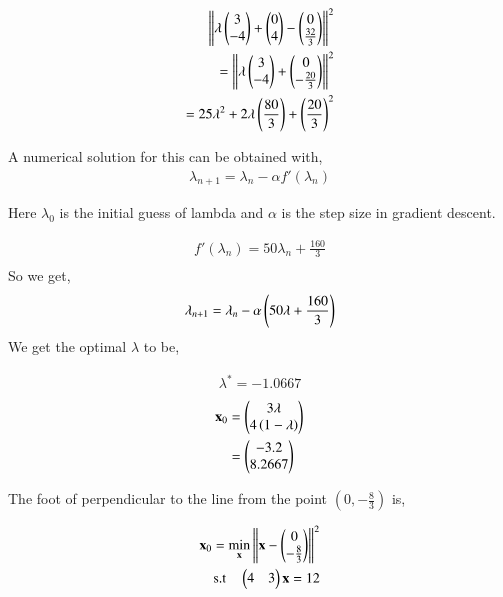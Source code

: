 \documentclass[journal,12pt,twocolumn]{IEEEtran}
\begin{document}
\begin{enumerate}
		\begin{align}
			\left\lVert\lambda \begin{pmatrix}3\\-4\end{pmatrix}+\begin{pmatrix}0\\4\end{pmatrix}-\begin{pmatrix}0\\\frac{32}{3}\end{pmatrix}\right\rVert^2\\
			= \left\lVert\lambda \begin{pmatrix}3\\-4\end{pmatrix}+\begin{pmatrix}0\\-\frac{20}{3}\end{pmatrix}\right\rVert^2\\
			= 25\lambda^2 +2\lambda \left(\frac{80}{3}\right)+\left(\frac{20}{3}\right)^2
		\end{align}

A numerical solution for this can be obtained with,
		\begin{align}
			\lambda_{n+1} = \lambda_n - \alpha f'(\lambda_n)
		\end{align}

Here $\lambda_0$ is the initial guess of lambda and $\alpha$ is the step size in gradient descent.

		\begin{align}
			f'(\lambda_n) = 50\lambda_n+\frac{160}{3}\\
		\end{align}
So we get,
		\begin{align}
			\lambda_{n+1} = \lambda_n - \alpha \left(50\lambda+\frac{160}{3}\right) 
		\end{align}
We get the optimal $\lambda$ to be,

		\begin{align}
			\lambda^* = -1.0667
		\end{align}
\begin{align}
	\mathbf{x}_0 &= \begin{pmatrix}3\lambda\\4\left(1-\lambda\right)\end{pmatrix}\\
		  &=\begin{pmatrix}-3.2\\8.2667\end{pmatrix}
\end{align}

		\begin{table}[h]
			\centering
			
			\caption{}
			\label{tab:1}
		\end{table}
		
The foot of perpendicular to the line from the point $(0,-\frac{8}{3})$ is,

		\begin{align}
			\mathbf{x}_0 = \min_{\mathbf{x}} \left\lVert\mathbf{x}-\begin{pmatrix}0\\-\frac{8}{3}\end{pmatrix}\right\rVert^2\\
			\text{s.t} \quad \begin{pmatrix}4 & 3\end{pmatrix}\mathbf{x} = 12
		\end{align}


\end{enumerate}
\end{document}
